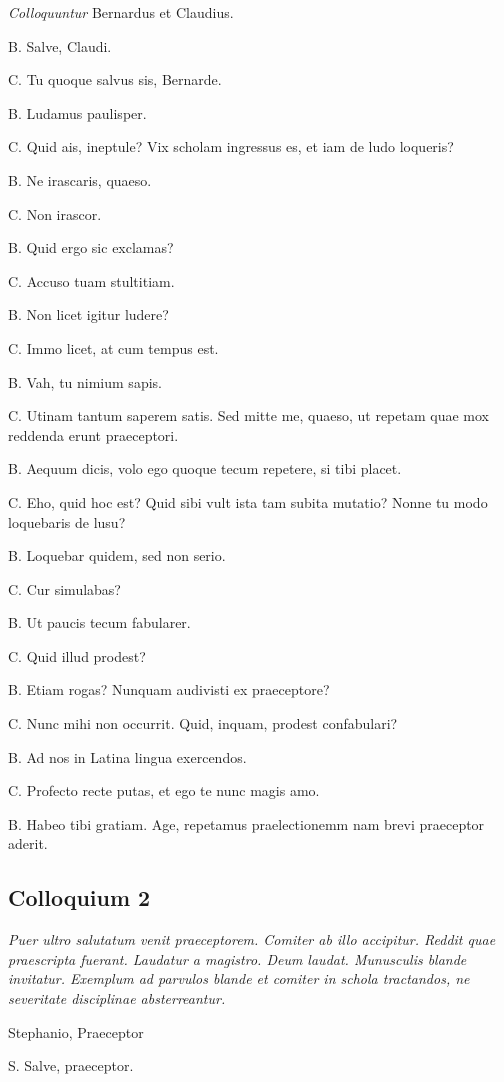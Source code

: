 \documentclass{article}
\begin{document}
\emph{Colloquuntur} Bernardus et Claudius.

B. Salve, Claudi.

C. Tu quoque salvus sis, Bernarde.

B. Ludamus paulisper.

C. Quid ais, ineptule? Vix scholam ingressus es, et iam de ludo loqueris?

B. Ne irascaris, quaeso.

C. Non irascor.

B. Quid ergo sic exclamas?

C. Accuso tuam stultitiam.

B. Non licet igitur ludere?

C. Immo licet, at cum tempus est.

B. Vah, tu nimium sapis.

C. Utinam tantum saperem satis. Sed mitte me, quaeso, ut repetam quae mox reddenda erunt praeceptori.

B. Aequum dicis, volo ego quoque tecum repetere, si tibi placet.

C. Eho, quid hoc est? Quid sibi vult ista tam subita mutatio? Nonne tu modo loquebaris de lusu?

B. Loquebar quidem, sed non serio.

C. Cur simulabas?

B. Ut paucis tecum fabularer.

C. Quid illud prodest?

B. Etiam rogas? Nunquam audivisti ex praeceptore?

C. Nunc mihi non occurrit. Quid, inquam, prodest confabulari?

B. Ad nos in Latina lingua exercendos.

C. Profecto recte putas, et ego te nunc magis amo.

B. Habeo tibi gratiam. Age, repetamus praelectionemm nam brevi praeceptor aderit.

\subsection{Colloquium 2}
\emph{Puer ultro salutatum venit praeceptorem. Comiter ab illo accipitur. Reddit quae praescripta fuerant. Laudatur a magistro. Deum laudat. Munusculis blande invitatur. Exemplum ad parvulos blande et comiter in schola tractandos, ne severitate disciplinae absterreantur.}

Stephanio, Praeceptor

S. Salve, praeceptor.
\end{document}
